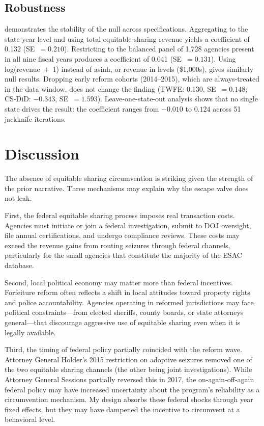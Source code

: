 \documentclass[12pt]{article}
\begin{document}
\subsection{Robustness}



 demonstrates the stability of the null across specifications. Aggregating to the state-year level and using total equitable sharing revenue yields a coefficient of 0.132 (SE~$= 0.210$). Restricting to the balanced panel of 1,728 agencies present in all nine fiscal years produces a coefficient of 0.041 (SE~$= 0.131$). Using log(revenue~$+$~1) instead of asinh, or revenue in levels (\$1,000s), gives similarly null results. Dropping early reform cohorts (2014--2015), which are always-treated in the data window, does not change the finding (TWFE: 0.130, SE~$= 0.148$; CS-DiD: $-0.343$, SE~$= 1.593$). Leave-one-state-out analysis shows that no single state drives the result: the coefficient ranges from $-0.010$ to $0.124$ across 51 jackknife iterations.


\section{Discussion}

The absence of equitable sharing circumvention is striking given the strength of the prior narrative. Three mechanisms may explain why the escape valve does not leak.

First, the federal equitable sharing process imposes real transaction costs. Agencies must initiate or join a federal investigation, submit to DOJ oversight, file annual certifications, and undergo compliance reviews. These costs may exceed the revenue gains from routing seizures through federal channels, particularly for the small agencies that constitute the majority of the ESAC database.

Second, local political economy may matter more than federal incentives. Forfeiture reform often reflects a shift in local attitudes toward property rights and police accountability. Agencies operating in reformed jurisdictions may face political constraints---from elected sheriffs, county boards, or state attorneys general---that discourage aggressive use of equitable sharing even when it is legally available.

Third, the timing of federal policy partially coincided with the reform wave. Attorney General Holder's 2015 restriction on adoptive seizures removed one of the two equitable sharing channels (the other being joint investigations). While Attorney General Sessions partially reversed this in 2017, the on-again-off-again federal policy may have increased uncertainty about the program's reliability as a circumvention mechanism. My design absorbs these federal shocks through year fixed effects, but they may have dampened the incentive to circumvent at a behavioral level.
\end{document}
